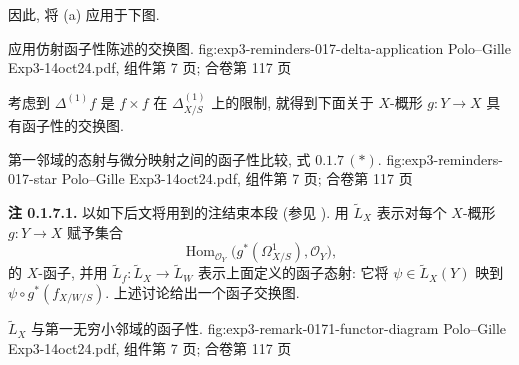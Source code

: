 因此, 将 (a) 应用于下图.

  {应用仿射函子性陈述的交换图.}
  {fig:exp3-reminders-017-delta-application}
  {Polo--Gille Exp3-14oct24.pdf, 组件第 7 页; 合卷第 117 页}

考虑到 \(\Delta^{(1)}f\) 是 \(f\times f\) 在
\(\Delta^{(1)}_{X/S}\) 上的限制, 就得到下面关于
\(X\)-概形 \(g:Y\to X\) 具有函子性的交换图.

  {第一邻域的态射与微分映射之间的函子性比较, 式 \(0.1.7\,(*)\).}
  {fig:exp3-reminders-017-star}
  {Polo--Gille Exp3-14oct24.pdf, 组件第 7 页; 合卷第 117 页}

\medskip
\noindent{}\textbf{注 0.1.7.1.}
以如下后文将用到的注结束本段 (参见
). 用 \(\widetilde L_X\)
表示对每个 \(X\)-概形 \(g:Y\to X\) 赋予集合
\[
 \operatorname{Hom}_{\mathscr O_Y}
 \bigl(g^*(\Omega^1_{X/S}),\mathscr O_Y\bigr),
\]
的 \(X\)-函子, 并用 \(\widetilde L_f:\widetilde L_X\to\widetilde L_W\)
表示上面定义的函子态射: 它将 \(\psi\in\widetilde L_X(Y)\) 映到
\(\psi\circ g^*(f_{X/W/S})\). 上述讨论给出一个函子交换图.

  {\(\widetilde L_X\) 与第一无穷小邻域的函子性.}
  {fig:exp3-remark-0171-functor-diagram}
  {Polo--Gille Exp3-14oct24.pdf, 组件第 7 页; 合卷第 117 页}

